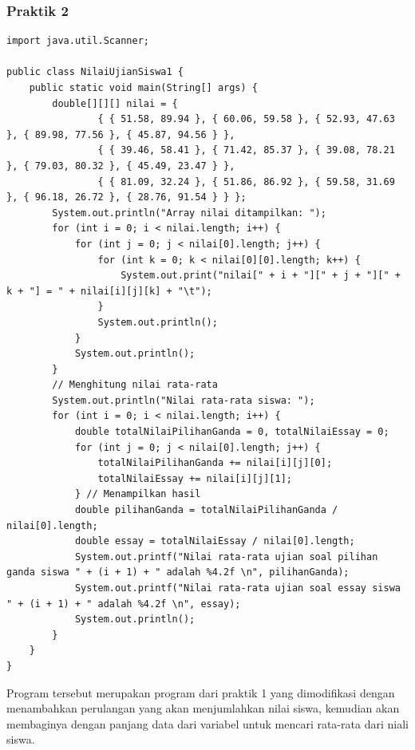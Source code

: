 \documentclass[a4paper,12pt]{article}
\begin{document}
\subsubsection{Praktik 2}
\begin{lstlisting}
import java.util.Scanner;

public class NilaiUjianSiswa1 {
    public static void main(String[] args) {
        double[][][] nilai = {
                { { 51.58, 89.94 }, { 60.06, 59.58 }, { 52.93, 47.63 }, { 89.98, 77.56 }, { 45.87, 94.56 } },
                { { 39.46, 58.41 }, { 71.42, 85.37 }, { 39.08, 78.21 }, { 79.03, 80.32 }, { 45.49, 23.47 } },
                { { 81.09, 32.24 }, { 51.86, 86.92 }, { 59.58, 31.69 }, { 96.18, 26.72 }, { 28.76, 91.54 } } };
        System.out.println("Array nilai ditampilkan: ");
        for (int i = 0; i < nilai.length; i++) {
            for (int j = 0; j < nilai[0].length; j++) {
                for (int k = 0; k < nilai[0][0].length; k++) {
                    System.out.print("nilai[" + i + "][" + j + "][" + k + "] = " + nilai[i][j][k] + "\t");
                }
                System.out.println();
            }
            System.out.println();
        }
        // Menghitung nilai rata-rata
        System.out.println("Nilai rata-rata siswa: ");
        for (int i = 0; i < nilai.length; i++) {
            double totalNilaiPilihanGanda = 0, totalNilaiEssay = 0;
            for (int j = 0; j < nilai[0].length; j++) {
                totalNilaiPilihanGanda += nilai[i][j][0];
                totalNilaiEssay += nilai[i][j][1];
            } // Menampilkan hasil
            double pilihanGanda = totalNilaiPilihanGanda / nilai[0].length;
            double essay = totalNilaiEssay / nilai[0].length;
            System.out.printf("Nilai rata-rata ujian soal pilihan ganda siswa " + (i + 1) + " adalah %4.2f \n", pilihanGanda);
            System.out.printf("Nilai rata-rata ujian soal essay siswa " + (i + 1) + " adalah %4.2f \n", essay);
            System.out.println();
        }
    }
}
\end{lstlisting}
Program tersebut merupakan program dari praktik 1 yang dimodifikasi dengan menambahkan perulangan yang akan menjumlahkan nilai siswa, kemudian akan membaginya
dengan panjang data dari variabel untuk mencari rata-rata dari niali siswa.
\end{document}
